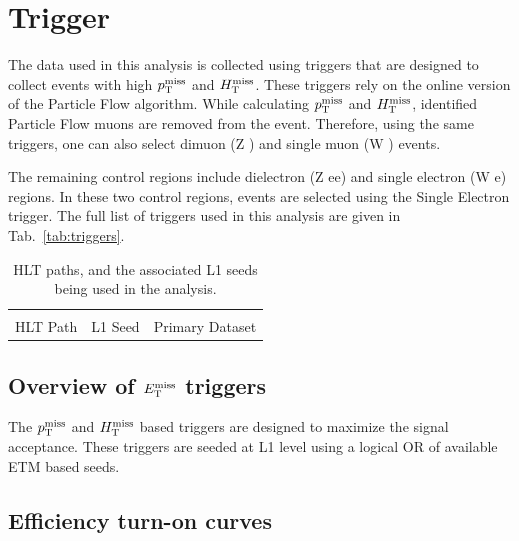 \section{Trigger} 
\label{sec:trigger}

The data used in this analysis is collected using triggers that are designed to collect events with high $p_{\mathrm{T}}^{\mathrm{miss}}$ and $H_{\mathrm{T}}^{\mathrm{miss}}$. 
These triggers rely on the online version of the Particle Flow algorithm. While calculating $p_{\mathrm{T}}^{\mathrm{miss}}$ and $H_{\mathrm{T}}^{\mathrm{miss}}$, identified
Particle Flow muons are removed from the event. Therefore, using the same triggers, one can also select dimuon (Z \rightarrow \mu \mu) 
and single muon (W \rightarrow \mu \nu) events.

The remaining control regions include dielectron (Z \rightarrow ee) and single electron (W \rightarrow e\nu) regions. In these two control
regions, events are selected using the Single Electron trigger. The full list of triggers used in this analysis are given in 
Tab.~\ref{tab:triggers}.

\begin{table}[ht!]
    \centering
    \small
    \def\arraystretch{1.5}
    \caption{HLT paths, and the associated L1 seeds being used in the analysis.}
    \begin{tabular}{l l c}
        \hline
        \hline
                                &                                               \\
        HLT Path                & L1 Seed                   & Primary Dataset   \\
        
    \end{tabular}
    
\end{table}

\subsection{Overview of $E_\mathrm{T}^{\mathrm{miss}}$ triggers}

The $p_{\mathrm{T}}^{\mathrm{miss}}$ and $H_{\mathrm{T}}^{\mathrm{miss}}$ based triggers are designed to maximize the signal acceptance. These triggers are seeded at L1 level using
a logical OR of available ETM based seeds. %


\subsection{Efficiency turn-on curves}

